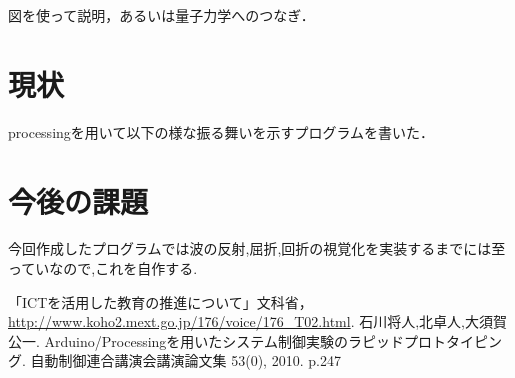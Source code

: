\documentclass[a4j,twocolumn,uplatex]{jarticle}
\begin{document}
図を使って説明，あるいは量子力学へのつなぎ．

\section{現状}
processingを用いて以下の様な振る舞いを示すプログラムを書いた．


\section{今後の課題}
今回作成したプログラムでは波の反射,屈折,回折の視覚化を実装するまでには至っていなので,これを自作する.


\begin{thebibliography}{9}
「ICTを活用した教育の推進について」文科省，\url{http://www.koho2.mext.go.jp/176/voice/176_T02.html}.
 石川将人,北卓人,大須賀公一. Arduino/Processingを用いたシステム制御実験のラピッドプロトタイピング. 自動制御連合講演会講演論文集 53(0), 2010. p.247 

\end{thebibliography}
\end{document}

